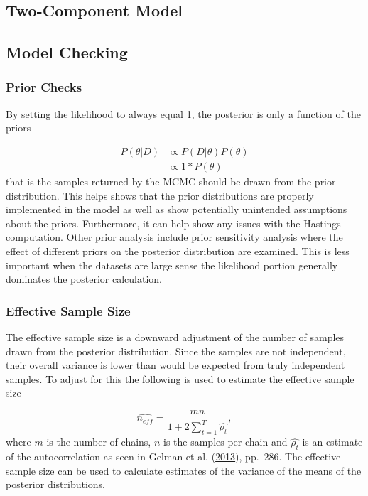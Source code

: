 \documentclass[11pt,a4paper]{article}
\begin{document}
\hypertarget{two-component-model}{%
\subsection{Two-Component Model}\label{two-component-model}}

\hypertarget{model-checking}{%
\subsection{Model Checking}\label{model-checking}}

\hypertarget{prior-checks}{%
\subsubsection{Prior Checks}\label{prior-checks}}

By setting the likelihood to always equal 1, the posterior is only a
function of the priors

\[\begin{aligned} P(\theta|D) & \propto P(D|\theta)P(\theta) \\ & \propto 1*P(\theta)  \end{aligned} \]
that is the samples returned by the MCMC should be drawn from the prior
distribution. This helps shows that the prior distributions are properly
implemented in the model as well as show potentially unintended
assumptions about the priors. Furthermore, it can help show any issues
with the Hastings computation. Other prior analysis include prior
sensitivity analysis where the effect of different priors on the
posterior distribution are examined. This is less important when the
datasets are large sense the likelihood portion generally dominates the
posterior calculation.

\hypertarget{effective-sample-size}{%
\subsubsection{Effective Sample Size}\label{effective-sample-size}}

The effective sample size is a downward adjustment of the number of
samples drawn from the posterior distribution. Since the samples are not
independent, their overall variance is lower than would be expected from
truly independent samples. To adjust for this the following is used to
estimate the effective sample size

\[ \widehat{n_{eff}} = \frac{mn}{1+ 2\sum_{t=1}^T \widehat{\rho_t}},  \]
where \(m\) is the number of chains, \(n\) is the samples per chain and
\(\widehat{\rho_t}\) is an estimate of the autocorrelation as seen in
Gelman et al. (\protect\hyperlink{ref-gelman_bayesian_2013}{2013}),
pp.~286. The effective sample size can be used to calculate estimates of
the variance of the means of the posterior distributions.
\end{document}
